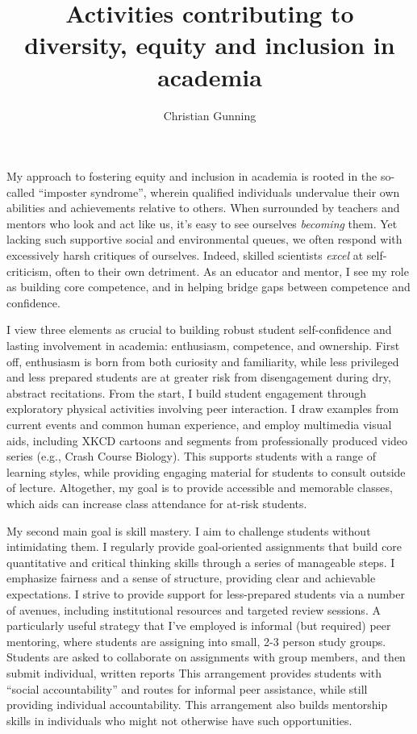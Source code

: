 \documentclass[12pt]{article}
\author{Christian Gunning}
\title{Activities contributing to\\diversity, equity and inclusion in academia}
\date{}
\begin{document}
\maketitle
\thispagestyle{empty}
\linespread{1.25}\selectfont

My approach to fostering equity and inclusion in academia 
is rooted in the so-called ``imposter syndrome'', wherein 
qualified individuals undervalue their own abilities and 
achievements relative to others.  When surrounded by 
teachers and mentors who look and act like us, it's easy to 
see ourselves {\em becoming} them.  Yet lacking such supportive 
social and environmental queues, we often respond with excessively
harsh critiques of ourselves. Indeed, skilled scientists
{\em excel} at self-criticism, often to their own detriment.
As an educator and mentor, I see my role as building 
core competence, and in helping
bridge gaps between competence and confidence.

I view three elements as crucial to building robust student 
self-confidence and lasting involvement in academia: enthusiasm, 
competence, and ownership.  First off, enthusiasm is born from both 
curiosity and familiarity, while less privileged and less prepared
students are at greater risk from disengagement during dry, abstract
recitations. From the start, I build student engagement 
through exploratory physical activities involving peer interaction.
I draw examples from current events and common 
human experience, and employ multimedia visual aids, including 
XKCD cartoons and segments from professionally produced
video series (e.g., Crash Course Biology). 
This supports students with a range of learning styles, while
providing engaging material for students to consult outside 
of lecture. Altogether, my goal is to provide accessible and 
memorable classes, which aids can increase class attendance for 
at-risk students.

My second main goal is skill mastery. 
I aim to challenge students without intimidating
them. I regularly provide goal-oriented assignments 
that build core quantitative and critical thinking skills 
through a series of manageable steps. I emphasize
fairness and a sense of structure, providing clear 
and achievable expectations. I strive to provide
support for less-prepared students via a number 
of avenues, including institutional resources and 
targeted review sessions. A particularly useful
strategy that I've employed is informal (but 
required) peer mentoring, where students are
assigning into small, 2-3 person study groups. Students
are asked to collaborate on assignments with group
members, and then submit individual, written reports
This arrangement provides students with ``social 
accountability'' and routes for informal peer 
assistance, while still providing individual accountability. 
This arrangement also builds mentorship skills in 
individuals who might not otherwise have such opportunities.
\end{document}
